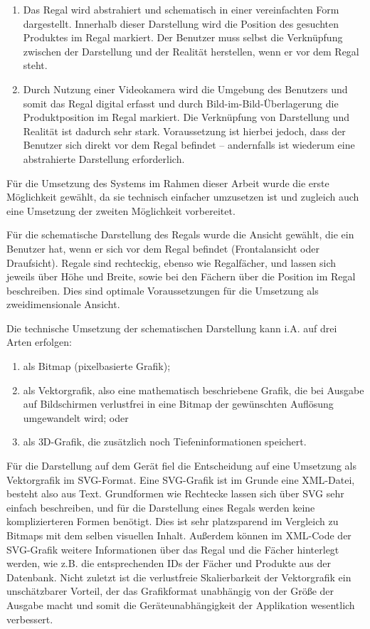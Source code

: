 \begin{enumerate}
	\item Das Regal wird abstrahiert und schematisch in einer vereinfachten Form dargestellt. Innerhalb dieser Darstellung wird die Position des gesuchten Produktes im Regal markiert. Der Benutzer muss selbst die Verknüpfung zwischen der Darstellung und der Realität herstellen, wenn er vor dem Regal steht.
	\item Durch Nutzung einer Videokamera wird die Umgebung des Benutzers und somit das Regal digital erfasst und durch Bild-im-Bild-Überlagerung die Produktposition im Regal markiert. Die Verknüpfung von Darstellung und Realität ist dadurch sehr stark. Voraussetzung ist hierbei jedoch, dass der Benutzer sich direkt vor dem Regal befindet -- andernfalls ist wiederum eine abstrahierte Darstellung erforderlich.
\end{enumerate}

Für die Umsetzung des Systems im Rahmen dieser Arbeit wurde die erste Möglichkeit gewählt, da sie technisch einfacher umzusetzen ist und zugleich auch eine Umsetzung der zweiten Möglichkeit vorbereitet.

Für die schematische Darstellung des Regals wurde die Ansicht gewählt, die ein Benutzer hat, wenn er sich vor dem Regal befindet (Frontalansicht oder Draufsicht). Regale sind rechteckig, ebenso wie Regalfächer, und lassen sich jeweils über Höhe und Breite, sowie bei den Fächern über die Position im Regal beschreiben. Dies sind optimale Voraussetzungen für die Umsetzung als zweidimensionale Ansicht.

Die technische Umsetzung der schematischen Darstellung kann i.A. auf drei Arten erfolgen:

\begin{enumerate}
	\item als Bitmap (pixelbasierte Grafik);
	\item als Vektorgrafik, also eine mathematisch beschriebene Grafik, die bei Ausgabe auf Bildschirmen verlustfrei in eine Bitmap der gewünschten Auflösung umgewandelt wird; oder
	\item als \acs{3D}-Grafik, die zusätzlich noch Tiefeninformationen speichert.
\end{enumerate}

Für die Darstellung auf dem Gerät fiel die Entscheidung auf eine Umsetzung als Vektorgrafik im \acs{SVG}-Format. Eine \acs{SVG}-Grafik ist im Grunde eine \acs{XML}-Datei, besteht also aus Text. Grundformen wie Rechtecke lassen sich über \acs{SVG} sehr einfach beschreiben, und für die Darstellung eines Regals werden keine komplizierteren Formen benötigt. Dies ist sehr platzsparend im Vergleich zu Bitmaps mit dem selben visuellen Inhalt. Außerdem können im \acs{XML}-Code der \acs{SVG}-Grafik weitere Informationen über das Regal und die Fächer hinterlegt werden, wie z.B. die entsprechenden IDs der Fächer und Produkte aus der Datenbank. Nicht zuletzt ist die verlustfreie Skalierbarkeit der Vektorgrafik ein unschätzbarer Vorteil, der das Grafikformat unabhängig von der Größe der Ausgabe macht und somit die Geräteunabhängigkeit der Applikation wesentlich verbessert.

